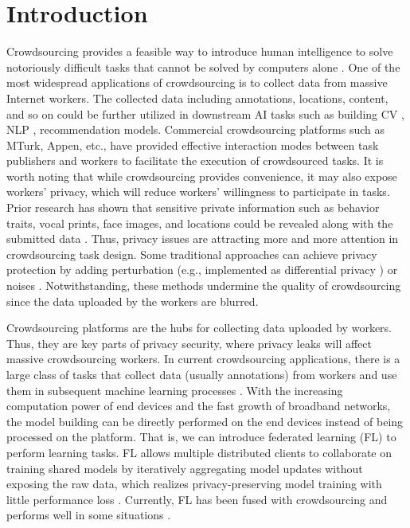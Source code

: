 \documentclass[final,1p,times]{elsarticle}
\begin{document}
\section{Introduction}
Crowdsourcing provides a feasible way to introduce human intelligence to solve notoriously difficult tasks that cannot be solved by computers alone \citep{Vaughan2017MakingBU}. One of the most widespread applications of crowdsourcing is to collect data from massive Internet workers. The collected data including annotations, locations, content, and so on could be further utilized in downstream AI tasks such as building CV \citep{Kovashka2016CrowdsourcingIC}, NLP \citep{Wang2013PerspectivesOC}, recommendation \citep{Lin2023CompetitiveGI} models. Commercial crowdsourcing platforms such as MTurk, Appen, etc., have provided effective interaction modes between task publishers and workers to facilitate the execution of crowdsourced tasks. It is worth noting that while crowdsourcing provides convenience, it may also expose workers' privacy, which will reduce workers' willingness to participate in tasks. Prior research has shown that sensitive private information such as behavior traits, vocal prints, face images, and locations could be revealed along with the submitted data \citep{xia2020privacy,Tong2020FederatedLI}. Thus, privacy issues are attracting more and more attention in crowdsourcing task design. Some traditional approaches can achieve privacy protection by adding perturbation (e.g., implemented as differential privacy \citep{luo2016incentive,wang2022pps}) or noises \citep{to2018ppo,huang2020traffic}. Notwithstanding, these methods undermine the quality of crowdsourcing since the data uploaded by the workers are blurred.

Crowdsourcing platforms are the hubs for collecting data uploaded by workers. Thus, they are key parts of privacy security, where privacy leaks will affect massive crowdsourcing workers. In current crowdsourcing applications, there is a large class of tasks that collect data (usually annotations) from workers and use them in subsequent machine learning processes \citep{Sheng2019MachineLW,Zhang2022KnowledgeLW}. With the increasing computation power of end devices and the fast growth of broadband networks, the model building can be directly performed on the end devices instead of being processed on the platform. That is, we can introduce federated learning (FL) \citep{mcmahan2017communication} to perform learning tasks. FL allows multiple distributed clients to collaborate on training shared models by iteratively aggregating model updates without exposing the raw data, which realizes privacy-preserving model training with little performance loss \citep{Yang2019FederatedML,Gao2022ASO}. Currently, FL has been fused with crowdsourcing and performs well in some situations \citep{Pandey2019ACF,Tong2020FederatedLI,zhang2021enabling}.
\end{document}
